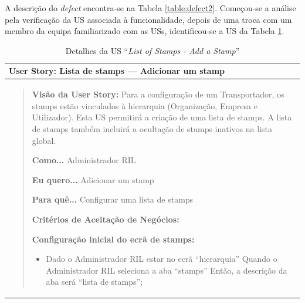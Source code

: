 
                A descrição do \textit{defect} encontra-se na Tabela \ref{table:defect2}. Começou-se a análise pela verificação da US associada à funcionalidade, depois de uma troca com um membro da equipa familiarizado com as USs, identificou-se a US da Tabela \ref{table:us1}.

                \begin{table}[H] %
                    \centering
                    \caption{Detalhes da US ``\textit{List of Stamps - Add a Stamp}''}\label{table:us1}
                    \begin{tabularx}{1\textwidth}{|>{\raggedright\arraybackslash}X|}
                        \hline
                        \rowcolor{lightgray}
                        \textbf{User Story:} Lista de stamps --- Adicionar um stamp \\
                        \hline
                        \rowcolor{lightgray!20}
                      
                        \begin{quote}
                            \textbf{Visão da User Story:} Para a configuração de um Transportador, os stamps estão vinculados à hierarquia (Organização, Empresa e Utilizador). Esta US permitirá a criação de uma lista de stamps. A lista de stamps também incluirá a ocultação de stamps inativos na lista global.
                        
                            \textbf{Como...} Administrador RIL
                        
                            \textbf{Eu quero...} Adicionar um stamp
                        
                            \textbf{Para quê...} Configurar uma lista de stamps
                        
                            \textbf{Critérios de Aceitação de Negócios:}
                        
                            \textbf{Configuração inicial do ecrã de stamps:}

                            \begin{itemize}
                                \item Dado o Administrador RIL estar no ecrã ``hierarquia'' \newline
                                Quando o Administrador RIL seleciona a aba ``stamps'' \newline
                                Então, a descrição da aba será ``lista de stamps'';


\end{itemize}
\end{quote}
\end{tabularx}
\end{table}
